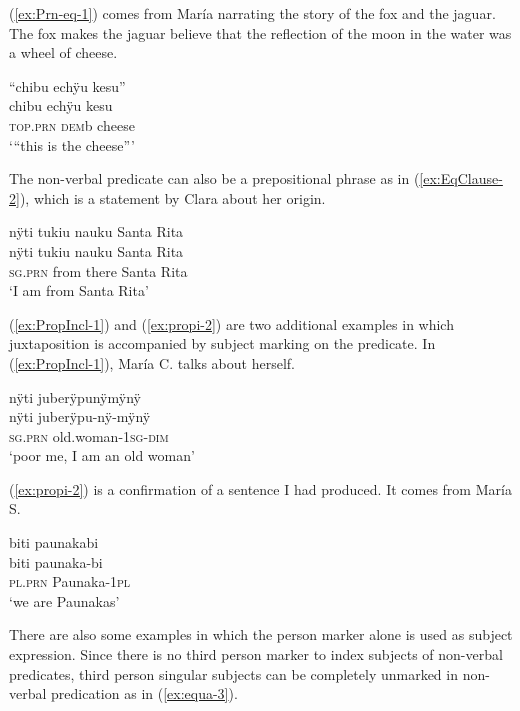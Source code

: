 (\ref{ex:Prn-eq-1}) comes from María narrating the story of the fox and the jaguar. The fox makes the jaguar believe that the reflection of the moon in the water was a wheel of cheese.

\ea\label{ex:Prn-eq-1}
\begingl
\glpreamble “chibu echÿu kesu”\\
\gla chibu echÿu kesu\\
\textsc{top.prn} \textsc{dem}b cheese\\
\glft ‘“this is the cheese”’
\endgl
\trailingcitation{[rxx-n120511l-1.037]}
\xe

The non-verbal predicate can also be a prepositional phrase as in (\ref{ex:EqClause-2}), which is a statement by Clara about her origin.

\ea\label{ex:EqClause-2}
\begingl 
\glpreamble nÿti tukiu nauku Santa Rita\\
\gla nÿti tukiu nauku {Santa Rita}\\ 
\textsc{sg.prn} from there {Santa Rita}\\ 
\glft ‘I am from Santa Rita’\\ 
\endgl
\trailingcitation{[cxx-e121130s.011]}
\xe

(\ref{ex:PropIncl-1}) and (\ref{ex:propi-2}) are two additional examples in which juxtaposition is accompanied by subject marking on the predicate. In (\ref{ex:PropIncl-1}), María C. talks about herself.

\ea\label{ex:PropIncl-1}
\begingl 
\glpreamble nÿti juberÿpunÿmÿnÿ\\
\gla nÿti juberÿpu-nÿ-mÿnÿ\\ 
\textsc{sg.prn} old.woman-1\textsc{sg}-\textsc{dim}\\ 
\glft ‘poor me, I am an old woman’\\ 
\endgl
\trailingcitation{[uxx-p110825l.038]}
\xe

(\ref{ex:propi-2}) is a confirmation of a sentence I had produced. It comes from María S.

\ea\label{ex:propi-2}
\begingl
\glpreamble biti paunakabi\\
\gla biti paunaka-bi\\
\textsc{pl.prn} Paunaka-1\textsc{pl}\\
\glft ‘we are Paunakas’
\endgl
\trailingcitation{[rmx-e150922l.103]}
\xe

There are also some examples in which the person marker alone is used as subject expression. Since there is no third person marker to index subjects of non-verbal predicates, third person singular subjects can be completely unmarked in non-verbal predication as in (\ref{ex:equa-3}).


